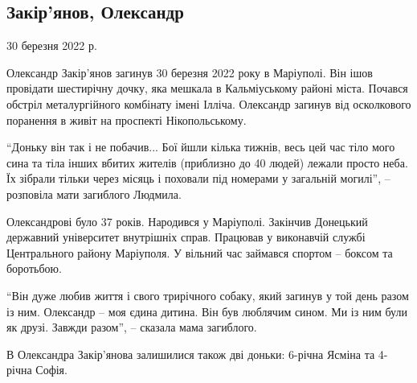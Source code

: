  
 
 
 
 

\subsection{Закір'янов, Олександр}
\label{sec:sites.victims_memorial.people.zakirjanov_oleksandr}


30 березня 2022 р.

Олександр Закір'янов загинув 30 березня 2022 року в Маріуполі. Він ішов
провідати шестирічну дочку, яка мешкала в Кальміуському районі міста. Почався
обстріл металургійного комбінату імені Ілліча. Олександр загинув від
осколкового поранення в живіт на проспекті Нікопольському.

\enquote{Доньку він так і не побачив... Бої йшли кілька тижнів, весь цей час тіло мого
сина та тіла інших вбитих жителів (приблизно до 40 людей) лежали просто неба.
Їх зібрали тільки через місяць і поховали під номерами у загальній могилі}, –
розповіла мати загиблого Людмила.

Олександрові було 37 років. Народився у Маріуполі. Закінчив Донецький державний
університет внутрішніх справ. Працював у виконавчій службі Центрального району
Маріуполя. У вільний час займався спортом – боксом та боротьбою.

\enquote{Він дуже любив життя і свого трирічного собаку, який загинув у той день разом
із ним. Олександр – моя єдина дитина. Він був люблячим сином. Ми із ним були як
друзі. Завжди разом}, – сказала мама загиблого.

В Олександра Закір'янова залишилися також дві доньки: 6-річна Ясміна та 4-річна
Софія.
